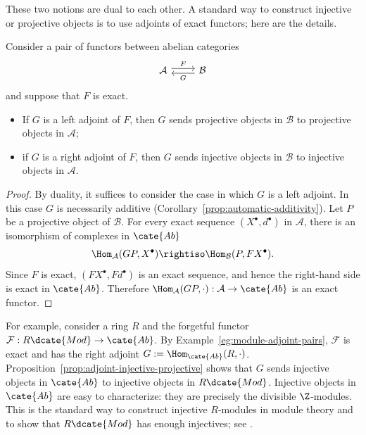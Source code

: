 These two notions are dual to each other. A standard way to construct
injective or projective objects is to use adjoints of exact functors; here are
the details.

\begin{proposition}\label{prop:adjoint-injective-projective}
Consider a pair of functors between abelian categories
\[\begin{tikzcd}
	\mathcal{A} \arrow[r, shift left, "F"] & \mathcal{B} \arrow[l, shift left, "G"]
\end{tikzcd}\]
and suppose that $F$ is exact.
\begin{itemize}
	\item If $G$ is a left adjoint of $F$, then $G$ sends projective objects in
	$\mathcal{B}$ to projective objects in $\mathcal{A}$;
	\item if $G$ is a right adjoint of $F$, then $G$ sends injective objects in
	$\mathcal{B}$ to injective objects in $\mathcal{A}$.
\end{itemize}
\end{proposition}

\begin{proof}
By duality, it suffices to consider the case in which $G$ is a left adjoint.
In this case $G$ is necessarily additive
(Corollary~\ref{prop:automatic-additivity}). Let $P$ be a projective object of
$\mathcal{B}$. For every exact sequence $(X^\bullet,d^\bullet)$ in
$\mathcal{A}$, there is an isomorphism of complexes in $\cate{Ab}$
\[
\Hom_{\mathcal{A}}(GP,X^\bullet)\rightiso
\Hom_{\mathcal{B}}(P,FX^\bullet).
\]
Since $F$ is exact, $(FX^\bullet,Fd^\bullet)$ is an exact sequence, and hence
the right-hand side is exact in $\cate{Ab}$. Therefore
$\Hom_{\mathcal{A}}(GP,\cdot):\mathcal{A}\to\cate{Ab}$ is an exact functor.
\end{proof}

For example, consider a ring $R$ and the forgetful functor
$\mathcal{F}:R\dcate{Mod}\to\cate{Ab}$. By
Example~\ref{eg:module-adjoint-pairs}, $\mathcal{F}$ is exact and has the right
adjoint $G:=\Hom_{\cate{Ab}}(R,\cdot)$.
Proposition~\ref{prop:adjoint-injective-projective} shows that $G$ sends
injective objects in $\cate{Ab}$ to injective objects in $R\dcate{Mod}$.
Injective objects in $\cate{Ab}$ are easy to characterize: they are precisely
the divisible $\Z$-modules. This is the standard way to construct injective
$R$-modules in module theory and to show that $R\dcate{Mod}$ has enough
injectives; see \cite[Theorem 6.9.14]{Li1}.

